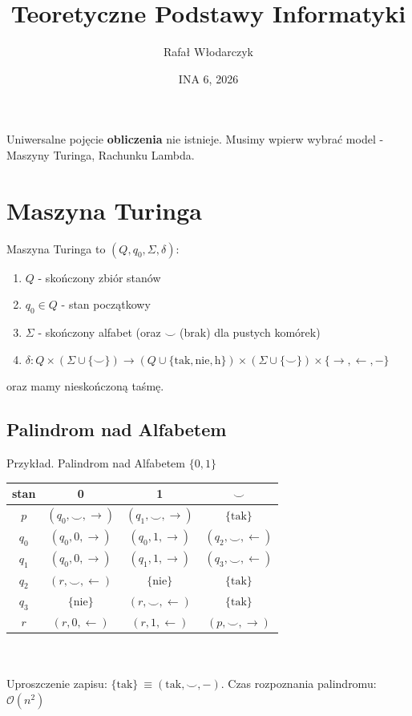 \documentclass{article}
\title{Teoretyczne Podstawy Informatyki}
\author{Rafał Włodarczyk}
\date{INA 6, 2026}
\numberwithin{equation}{subsection}
\begin{document}
\maketitle

\tableofcontents

\vspace{1cm}

\noindent
Uniwersalne pojęcie \textbf{obliczenia} nie istnieje. Musimy wpierw wybrać model - Maszyny Turinga, Rachunku Lambda.

\section{Maszyna Turinga}

Maszyna Turinga to $(Q,q_0,\Sigma,\delta)$:
\begin{enumerate}
    \item $Q$ - skończony zbiór stanów
    \item $q_0 \in Q$ - stan początkowy
    \item $\Sigma$ - skończony alfabet (oraz $\smile$ (brak) dla pustych komórek)
    \item $\delta : Q \times (\Sigma \cup \{\smile\}) \to (Q \cup \{\text{tak},\text{nie},\text{h}\}) \times (\Sigma \cup \{\smile\}) \times \{\to, \leftarrow, -\}$
\end{enumerate}
oraz mamy nieskończoną taśmę.

\subsection{Palindrom nad Alfabetem}

Przykład. Palindrom nad Alfabetem $\{0,1\}$\\
\begin{tabular}{|c|ccc|}
\hline
stan & 0 & 1 & $\smile$ \\
\hline
$p$ & $(q_0,\smile,\to)$ & $(q_1,\smile,\to)$ & $\{\text{tak}\}$ \\
$q_0$ & $(q_0, 0, \to)$ & $(q_0, 1, \to)$ & $(q_2, \smile, \leftarrow)$ \\
$q_1$ & $(q_0, 0, \to)$ & $(q_1, 1, \to)$ & $(q_3, \smile, \leftarrow)$ \\
$q_2$ & $(r,\smile, \leftarrow)$ & $\{\text{nie}\}$ & $\{\text{tak}\}$ \\ 
$q_3$ & $\{\text{nie}\}$ & $(r,\smile,\leftarrow)$ & $\{\text{tak}\}$ \\ 
$r$ & $(r,0,\leftarrow)$ & $(r, 1, \leftarrow)$ & $(p,\smile,\to)$ \\
\hline
\end{tabular}
\\\\
Uproszczenie zapisu: $\{\text{tak}\}\ \equiv (\text{tak}, \smile, -)$. Czas rozpoznania palindromu: $\mathcal{O}(n^2)$
\end{document}
